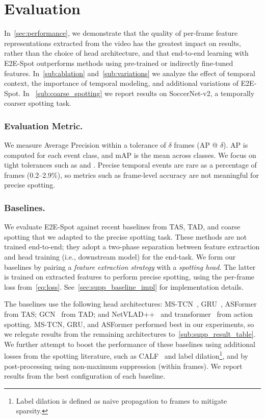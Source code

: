 \documentclass[runningheads]{llncs}
\newcommand{\notation}[1]{\ensuremath{#1}\xspace}
\newcommand{\OURMETHOD}{{E2E-Spot}\xspace}
\newcommand{\soccernet}{{SoccerNet-v2}\xspace}
\newcommand{\Tolerance}{\notation{\delta}}
\begin{document}
\section{Evaluation}
\label{sec:result}

In~\autoref{sec:performance}, we demonstrate that the quality of per-frame feature representations extracted from the video has the
greatest impact on results, rather than the choice of head architecture, and that end-to-end learning with \OURMETHOD outperforms methods using pre-trained or indirectly fine-tuned features.
In~\autoref{sub:ablation} and~\autoref{sub:variations} we analyze the effect of temporal context, the importance of temporal modeling, and additional variations of \OURMETHOD.
In ~\autoref{sub:coarse_spotting} we report results on \soccernet, a temporally coarser spotting task.

\subsubsection*{Evaluation Metric.}
We measure Average Precision within a tolerance of \Tolerance frames (AP @ \Tolerance).
AP is computed for each event class, and mAP is the mean across classes.
We focus on tight tolerances such as  and .
Precise temporal events are rare as a percentage of frames (0.2--2.9\%), so
metrics such as frame-level accuracy are not meaningful for precise spotting.

\subsubsection*{Baselines.}
We evaluate \OURMETHOD against recent baselines from TAS, TAD, and coarse spotting that we adapted to the precise spotting task.
These methods are not trained end-to-end;
they adopt a two-phase separation between feature extraction and head training (i.e., downstream model) for the end-task.
We form our baselines by pairing a \emph{feature extraction strategy} with a \emph{spotting head}. The latter is trained on extracted features
to perform precise spotting, using the per-frame loss from~\autoref{eq:loss}.
See~\autoref{sec:supp_baseline_impl} for implementation details.

The baselines use the following head architectures: MS-TCN~\cite{mstcn}, GRU~\cite{gatedrnn}, ASFormer~\cite{asformer} from TAS; GCN~\cite{gtad} from TAD; and NetVLAD++~\cite{netvladpp} and transformer~\cite{featurecombattention} from action spotting.
MS-TCN, GRU, and ASFormer performed best in our experiments, so we relegate results from the remaining architectures to~\autoref{sub:supp_result_table}.
We further attempt to boost the performance of these baselines using additional losses from the spotting literature, such as CALF~\cite{calf} and label dilation\footnote{Label dilation is defined as naive propagation to  frames to mitigate sparsity.}, and by post-processing using non-maximum suppression (within  frames).
We report results from the best configuration of each baseline.
\end{document}
